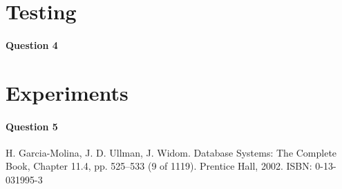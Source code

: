 \documentclass[a4paper, 11pt]{article}
\begin{document}

\section{Testing} %
\label{sec:testing}

\paragraph{Question 4} %
\label{par:question_4}



\section{Experiments} %
\label{sec:experiments}

\paragraph{Question 5} %
\label{par:question_5}




\begin{thebibliography}{9}

    H. Garcia-Molina, J. D. Ullman, J. Widom.
    Database Systems: The Complete Book,
    Chapter 11.4, pp. 525–533 (9 of 1119).
    Prentice Hall, 2002.
    ISBN: 0-13-031995-3
\end{thebibliography}
\end{document}
